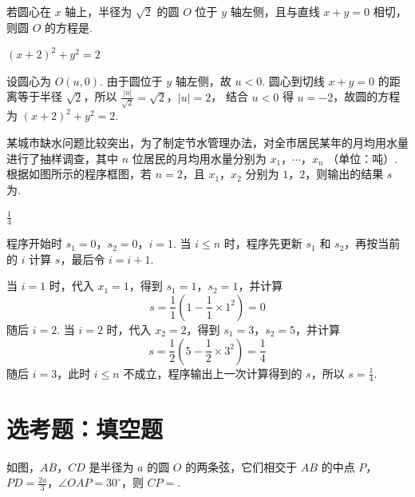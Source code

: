 \begin{problem}
若圆心在 \(x\) 轴上，半径为 \(\sqrt{2}\) 的圆 \(O\) 位于 \(y\) 轴左侧，且与直线 \(x + y = 0\) 相切，则圆 \(O\) 的方程是\fillinblank{}.
\end{problem}

\begin{answer}
\((x+2)^2+y^2=2\)
\end{answer}

\begin{solution}
设圆心为 \(O(u,0)\). 由于圆位于 \(y\) 轴左侧，故 \(u<0\). 圆心到切线 \(x+y=0\) 的距离等于半径 \(\sqrt2\)，所以
\(\frac{|u|}{\sqrt2}=\sqrt2\)，\(|u|=2\)，
结合 \(u<0\) 得 \(u=-2\)，故圆的方程为 \((x+2)^2+y^2=2\).
\end{solution}

\begin{problem}
某城市缺水问题比较突出，为了制定节水管理办法，对全市居民某年的月均用水量进行了抽样调查，其中 \(n\) 位居民的月均用水量分别为 \(x_{1}\)，\(\cdots\)，\(x_{n}\) （单位：\(\text{吨}\)）. 根据如图所示的程序框图，若 \(n = 2\)，且 \(x_{1}\)，\(x_{2}\) 分别为 \(1\)，\(2\)，则输出的结果 \(s\) 为\fillinblank{}.

\end{problem}

\begin{answer}
\(\frac{1}{4}\)
\end{answer}

\begin{solution}
程序开始时 \(s_1=0\)，\(s_2=0\)，\(i=1\). 当 \(i\leqslant n\) 时，程序先更新 \(s_1\) 和 \(s_2\)，再按当前的 \(i\) 计算 \(s\)，最后令 \(i=i+1\).

当 \(i=1\) 时，代入 \(x_1=1\)，得到 \(s_1=1\)，\(s_2=1\)，并计算
\[
s=\frac11\left(1-\frac11\times1^2\right)=0
\]
随后 \(i=2\). 当 \(i=2\) 时，代入 \(x_2=2\)，得到 \(s_1=3\)，\(s_2=5\)，并计算
\[
s=\frac12\left(5-\frac12\times3^2\right)=\frac14
\]
随后 \(i=3\)，此时 \(i\leqslant n\) 不成立，程序输出上一次计算得到的 \(s\)，所以 \(s=\frac14\).
\end{solution}

\section{选考题：填空题}

\begin{problem}
如图，\(AB\)，\(CD\) 是半径为 \(a\) 的圆 \(O\) 的两条弦，它们相交于 \(AB\) 的中点 \(P\)，\(PD = \frac{2a}{3}\)，\(\angle OAP = 30^\circ\)，则 \(CP = \)\fillinblank{}.

\end{problem}

